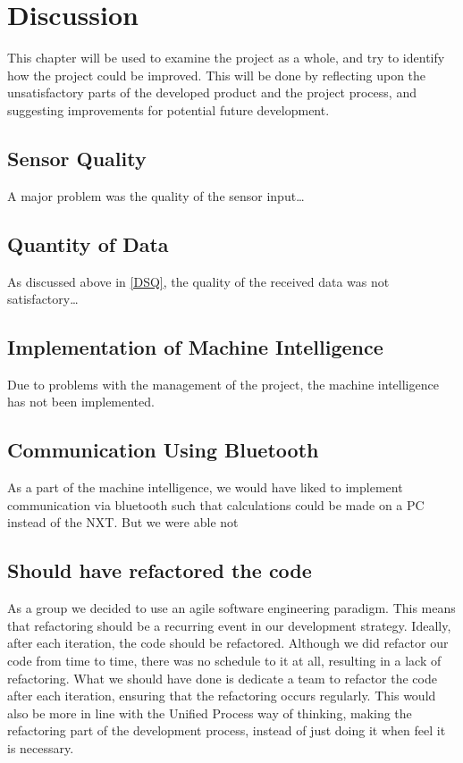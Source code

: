 \chapter{Discussion}\label{projDiscus}
This chapter will be used to examine the project as a whole, and try to identify
how the project could be improved. This will be done by reflecting upon the
unsatisfactory parts of the developed product and the project process, and
suggesting improvements for potential future development.

\section{Sensor Quality}\label{DSQ}
A major problem was the quality of the sensor input\ldots

\section{Quantity of Data}
As discussed above in \autoref{DSQ}, the quality of the received data was not
satisfactory\ldots

\section{Implementation of Machine Intelligence}
Due to problems with the management of the project, the machine intelligence has
not been implemented.

\section{Communication Using Bluetooth}
As a part of the machine intelligence, we would have liked to implement
communication via bluetooth such that calculations could be made on a PC instead
of the NXT. But we were able not 

\section{Should have refactored the code}
As a group we decided to use an agile software engineering paradigm. This means that
refactoring should be a recurring event in our development strategy. Ideally, after each iteration, the code should be refactored. Although we did refactor our code from time to time, there was no schedule to it at all, resulting in a lack of refactoring. What we should have done is dedicate a team to refactor the code after each iteration, ensuring that the refactoring occurs regularly. This would also be more in line with the Unified Process way of thinking, making the refactoring part of the development process, instead of just doing it when feel it is necessary.

